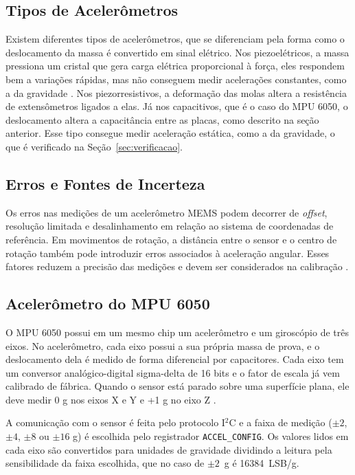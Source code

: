 \documentclass[conference]{IEEEtran}
\begin{document}
\subsection{Tipos de Acelerômetros}
Existem diferentes tipos de acelerômetros, que se diferenciam pela forma como o deslocamento da massa é convertido em sinal elétrico. Nos piezoelétricos, a massa pressiona um cristal que gera carga elétrica proporcional à força, eles respondem bem a variações rápidas, mas não conseguem medir acelerações constantes, como a da gravidade \cite[pp.~187--189]{aguirre2013fundamentos}. Nos piezorresistivos, a deformação das molas altera a resistência de extensômetros ligados a elas. Já nos capacitivos, que é o caso do MPU 6050, o deslocamento altera a capacitância entre as placas, como descrito na seção anterior. Esse tipo consegue medir aceleração estática, como a da gravidade, o que é verificado na Seção~\ref{sec:verificacao}.

\subsection{Erros e Fontes de Incerteza}

Os erros nas medições de um acelerômetro MEMS podem decorrer de \textit{offset}, resolução limitada e desalinhamento em relação ao sistema de coordenadas de referência. Em movimentos de rotação, a distância entre o sensor e o centro de rotação também pode introduzir erros associados à aceleração angular. Esses fatores reduzem a precisão das medições e devem ser considerados na calibração \cite{Ghanipoor2020}.

\subsection{Acelerômetro do MPU 6050}
O MPU 6050 possui em um mesmo chip um acelerômetro e um giroscópio de três eixos. No acelerômetro, cada eixo possui a sua própria massa de prova, e o deslocamento dela é medido de forma diferencial por capacitores. Cada eixo tem um conversor analógico-digital sigma-delta de 16 bits e o fator de escala já vem calibrado de fábrica. Quando o sensor está parado sobre uma superfície plana, ele deve medir 0 g nos eixos X e Y e +1 g no eixo Z \cite{mpu6050}.

A comunicação com o sensor é feita pelo protocolo I$^2$C e a faixa de medição ($\pm 2$, $\pm 4$, $\pm 8$ ou $\pm 16$ g) é escolhida pelo registrador \texttt{ACCEL\_CONFIG}. Os valores lidos em cada eixo são convertidos para unidades de gravidade dividindo a leitura pela sensibilidade da faixa escolhida, que no caso de $\pm 2$~g é 16384~LSB/g.
\end{document}
